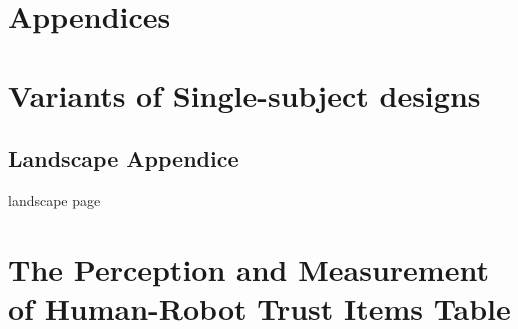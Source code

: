 \section*{Appendices}
\section{Variants of Single-subject designs}

\newpage
\begin{landscape}
	\section{Landscape Appendice}
	\label{app:Educational}	
	landscape page
\end{landscape}

\newpage
\section{The Perception and Measurement of Human-Robot Trust Items Table}

